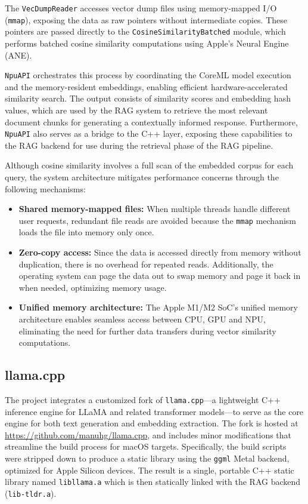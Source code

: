 The \texttt{VecDumpReader} accesses vector dump files using memory-mapped I/O (\texttt{mmap}), exposing the data as raw pointers without intermediate copies. These pointers are passed directly to the \texttt{CosineSimilarityBatched} module, which performs batched cosine similarity computations using Apple's Neural Engine (ANE).

\texttt{NpuAPI} orchestrates this process by coordinating the CoreML model execution and the memory-resident embeddings, enabling efficient hardware-accelerated similarity search. The output consists of similarity scores and embedding hash values, which are used by the RAG system to retrieve the most relevant document chunks for generating a contextually informed response. Furthermore, \texttt{NpuAPI} also serves as a bridge to the C++ layer, exposing these capabilities to the RAG backend for use during the retrieval phase of the RAG pipeline.

Although cosine similarity involves a full scan of the embedded corpus for each query, the system architecture mitigates performance concerns through the following mechanisms:

\begin{itemize}
    \item \textbf{Shared memory-mapped files:} When multiple threads handle different user requests, redundant file reads are avoided because the \texttt{mmap} mechanism loads the file into memory only once.
    
    \item \textbf{Zero-copy access:} Since the data is accessed directly from memory without duplication, there is no overhead for repeated reads. Additionally, the operating system can page the data out to swap memory and page it back in when needed, optimizing memory usage.
    
    \item \textbf{Unified memory architecture:} The Apple M1/M2 SoC’s unified memory architecture enables seamless access between CPU, GPU and NPU, eliminating the need for further data transfers during vector similarity computations.
\end{itemize}

\subsection{llama.cpp}
\label{subsec:AppDesignModules-LLaMaCpp}

The project integrates a customized fork of \texttt{llama.cpp}—a lightweight C++ inference engine for LLaMA and related transformer models—to serve as the core engine for both text generation and embedding extraction. The fork is hosted at \url{https://github.com/manuhg/llama.cpp}, and includes minor modifications that streamline the build process for macOS targets. Specifically, the build scripts were stripped down to produce a static library using the \texttt{ggml} Metal backend, optimized for Apple Silicon devices.  The result is a single, portable C++ static library named \texttt{libllama.a} which is then statically linked with the RAG backend (\texttt{lib-tldr.a}).

